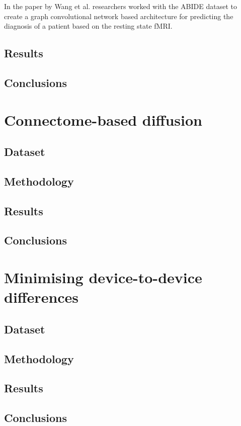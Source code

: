 	In the paper \cite{wang2021graph} by Wang et al. researchers worked with the ABIDE dataset to create a graph convolutional network based architecture for predicting the diagnosis of a patient based on the resting state fMRI. 
	
	\subsection{Results}
	
	\subsection{Conclusions}

\section{Connectome-based diffusion}

	\subsection{Dataset}
	
	\subsection{Methodology}
	
	\subsection{Results}
	
	\subsection{Conclusions}

\section{Minimising device-to-device differences}

	\subsection{Dataset}
	
	\subsection{Methodology}
	
	\subsection{Results}
	
	\subsection{Conclusions}